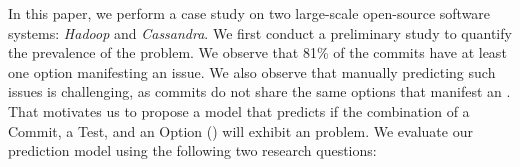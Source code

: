 

In this paper, we perform a case study on two large-scale open-source software systems: \emph{Hadoop} and \emph{Cassandra}. We first conduct a preliminary study to quantify the prevalence of the \inconsistent problem. We observe that 81\% of the commits have at least one option manifesting an \inconsistent issue. We also observe that manually predicting such issues is challenging, as commits do not share the same options that manifest an \inconsistent. That motivates us to propose a model that predicts if the combination of a Commit, a Test, and an Option (\textbf{\instance}) will exhibit an \inconsistent problem. We evaluate our prediction model using the following two research questions: 


